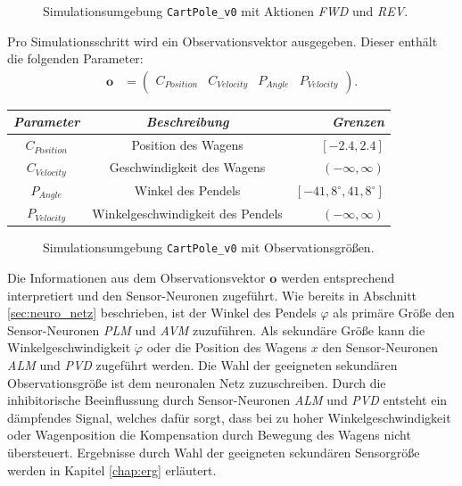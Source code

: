 	\begin{figure}[H] %
		\centering
		\def\svgwidth{12cm}
		
		\caption{Simulationsumgebung \texttt{CartPole\_v0} mit Aktionen \textit{FWD} und \textit{REV}.}
		\label{fig:imp_cartpole_FWD_REV}
	\end{figure}
	Pro Simulationsschritt wird ein Observationsvektor ausgegeben. Dieser enthält die folgenden Parameter:
	\begin{align}
		\boldsymbol{o} &= \begin{pmatrix}C_{Position} & C_{Velocity} & P_{Angle} & P_{Velocity}\end{pmatrix}\text{.}
	\end{align}
	\begin{center}
		\begin{tabular}{c@{\hskip 0.5cm}c@{\hskip 0.5cm}r@{\hskip 0.5cm}}    \toprule
			\setlength{\tabcolsep}{50pt}
			\renewcommand{\arraystretch}{1.5}
			\emph{Parameter}	& \emph{Beschreibung}  				& \emph{Grenzen} 			\\\midrule
			$C_{Position}$		& Position des Wagens				& $[-2.4, 2.4]$				\\
			$C_{Velocity}$		& Geschwindigkeit des Wagens		& $(-\infty, \infty)$		\\
			$P_{Angle}$			& Winkel des Pendels				& $[-41,8^{\circ}, 41,8^{\circ}]$	\\
			$P_{Velocity}$		& Winkelgeschwindigkeit des Pendels	& $(-\infty, \infty)$		\\\bottomrule
			\hline
		\end{tabular}
	\end{center}
	\begin{figure}[!h] %
		\centering
		\def\svgwidth{12cm}
		
		\caption{Simulationsumgebung \texttt{CartPole\_v0} mit Observationsgrößen.}
		\label{fig:imp_cartpole_observation}
	\end{figure}
	Die Informationen aus dem Observationsvektor $\boldsymbol{o}$ werden entsprechend interpretiert und den Sensor-Neuronen zugeführt. Wie bereits in Abschnitt \ref{sec:neuro_netz} beschrieben, ist der Winkel des Pendels $\varphi$ als primäre Größe den Sensor-Neuronen \textit{PLM} und \textit{AVM} zuzuführen. Als sekundäre Größe kann die Winkelgeschwindigkeit $\dot{\varphi}$ oder die Position des Wagens $x$ den Sensor-Neuronen \textit{ALM} und \textit{PVD} zugeführt werden. Die Wahl der geeigneten sekundären Observationsgröße ist dem neuronalen Netz zuzuschreiben. Durch die inhibitorische Beeinflussung durch Sensor-Neuronen \textit{ALM} und \textit{PVD} entsteht ein dämpfendes Signal, welches dafür sorgt, dass bei zu hoher Winkelgeschwindigkeit oder Wagenposition die Kompensation durch Bewegung des Wagens nicht übersteuert. Ergebnisse durch Wahl der geeigneten sekundären Sensorgröße werden in Kapitel \ref{chap:erg} erläutert.

